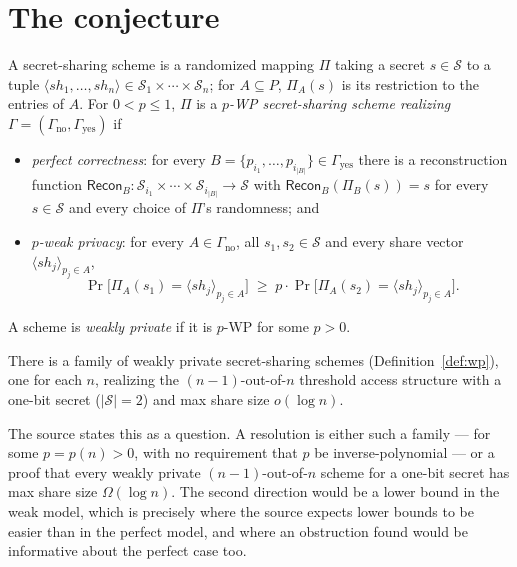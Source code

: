 \documentclass{aicr-conjecture}
\newcommand{\Sh}{\mathcal{S}}
\newcommand{\Recon}{\mathsf{Recon}}
\begin{document}
\section{The conjecture}\label{sec:conjectures}

\begin{definition}\label{def:wp}
A secret-sharing scheme is a randomized mapping $\Pi$ taking a secret $s
\in \Sh$ to a tuple $\langle sh_{1}, \dots, sh_{n} \rangle \in \Sh_{1}
\times \cdots \times \Sh_{n}$; for $A \subseteq P$, $\Pi_{A}(s)$ is its
restriction to the entries of $A$. For $0 < p \le 1$, $\Pi$ is a
\emph{$p$-WP secret-sharing scheme realizing} $\Gamma =
(\Gamma_{\mathrm{no}}, \Gamma_{\mathrm{yes}})$ if
\begin{itemize}[nosep]
  \item \emph{perfect correctness}: for every $B = \{p_{i_{1}}, \dots,
    p_{i_{|B|}}\} \in \Gamma_{\mathrm{yes}}$ there is a reconstruction
    function $\Recon_{B} : \Sh_{i_{1}} \times \cdots \times
    \Sh_{i_{|B|}} \to \Sh$ with $\Recon_{B}(\Pi_{B}(s)) = s$ for every $s
    \in \Sh$ and every choice of $\Pi$'s randomness; and
  \item \emph{$p$-weak privacy}: for every $A \in \Gamma_{\mathrm{no}}$,
    all $s_{1}, s_{2} \in \Sh$ and every share vector $\langle sh_{j}
    \rangle_{p_{j} \in A}$,
    \[
      \Pr\bigl[ \Pi_{A}(s_{1}) = \langle sh_{j} \rangle_{p_{j} \in A}
      \bigr] \;\ge\; p \cdot \Pr\bigl[ \Pi_{A}(s_{2}) = \langle sh_{j}
      \rangle_{p_{j} \in A} \bigr].
    \]
\end{itemize}
A scheme is \emph{weakly private} if it is $p$-WP for some $p > 0$.
\end{definition}

\begin{conjecture}\label{conj:main}
There is a family of weakly private secret-sharing schemes
(Definition~\ref{def:wp}), one for each $n$, realizing the
$(n-1)$-out-of-$n$ threshold access structure with a one-bit secret
($|\Sh| = 2$) and max share size $o(\log n)$.
\end{conjecture}

\begin{remark}
The source states this as a question. A resolution is either such a
family --- for some $p = p(n) > 0$, with no requirement that $p$ be
inverse-polynomial --- or a proof that every weakly private
$(n-1)$-out-of-$n$ scheme for a one-bit secret has max share size
$\Omega(\log n)$. The second direction would be a lower bound in the weak
model, which is precisely where the source expects lower bounds to be
easier than in the perfect model, and where an obstruction found would
be informative about the perfect case too.
\end{remark}
\end{document}
